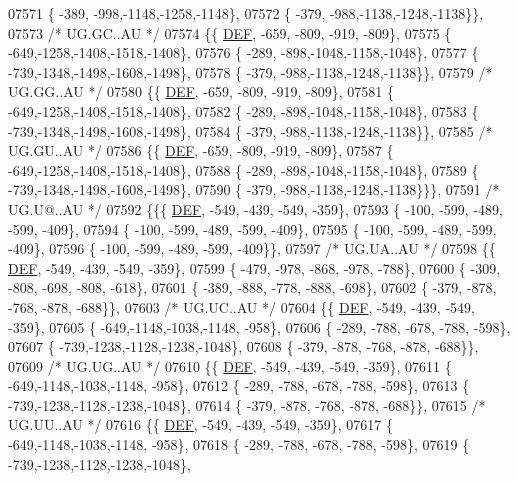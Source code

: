 \begin{DoxyCode}
07571 \{ -389, -998,-1148,-1258,-1148\},
07572 \{ -379, -988,-1138,-1248,-1138\}\},
07573 \textcolor{comment}{/* UG.GC..AU */}
07574 \{\{  \mbox{\hyperlink{1_88_84__epars_8h_a397419fc12b37ed479c8abb9d444d843}{DEF}}, -659, -809, -919, -809\},
07575 \{ -649,-1258,-1408,-1518,-1408\},
07576 \{ -289, -898,-1048,-1158,-1048\},
07577 \{ -739,-1348,-1498,-1608,-1498\},
07578 \{ -379, -988,-1138,-1248,-1138\}\},
07579 \textcolor{comment}{/* UG.GG..AU */}
07580 \{\{  \mbox{\hyperlink{1_88_84__epars_8h_a397419fc12b37ed479c8abb9d444d843}{DEF}}, -659, -809, -919, -809\},
07581 \{ -649,-1258,-1408,-1518,-1408\},
07582 \{ -289, -898,-1048,-1158,-1048\},
07583 \{ -739,-1348,-1498,-1608,-1498\},
07584 \{ -379, -988,-1138,-1248,-1138\}\},
07585 \textcolor{comment}{/* UG.GU..AU */}
07586 \{\{  \mbox{\hyperlink{1_88_84__epars_8h_a397419fc12b37ed479c8abb9d444d843}{DEF}}, -659, -809, -919, -809\},
07587 \{ -649,-1258,-1408,-1518,-1408\},
07588 \{ -289, -898,-1048,-1158,-1048\},
07589 \{ -739,-1348,-1498,-1608,-1498\},
07590 \{ -379, -988,-1138,-1248,-1138\}\}\},
07591 \textcolor{comment}{/* UG.U@..AU */}
07592 \{\{\{  \mbox{\hyperlink{1_88_84__epars_8h_a397419fc12b37ed479c8abb9d444d843}{DEF}}, -549, -439, -549, -359\},
07593 \{ -100, -599, -489, -599, -409\},
07594 \{ -100, -599, -489, -599, -409\},
07595 \{ -100, -599, -489, -599, -409\},
07596 \{ -100, -599, -489, -599, -409\}\},
07597 \textcolor{comment}{/* UG.UA..AU */}
07598 \{\{  \mbox{\hyperlink{1_88_84__epars_8h_a397419fc12b37ed479c8abb9d444d843}{DEF}}, -549, -439, -549, -359\},
07599 \{ -479, -978, -868, -978, -788\},
07600 \{ -309, -808, -698, -808, -618\},
07601 \{ -389, -888, -778, -888, -698\},
07602 \{ -379, -878, -768, -878, -688\}\},
07603 \textcolor{comment}{/* UG.UC..AU */}
07604 \{\{  \mbox{\hyperlink{1_88_84__epars_8h_a397419fc12b37ed479c8abb9d444d843}{DEF}}, -549, -439, -549, -359\},
07605 \{ -649,-1148,-1038,-1148, -958\},
07606 \{ -289, -788, -678, -788, -598\},
07607 \{ -739,-1238,-1128,-1238,-1048\},
07608 \{ -379, -878, -768, -878, -688\}\},
07609 \textcolor{comment}{/* UG.UG..AU */}
07610 \{\{  \mbox{\hyperlink{1_88_84__epars_8h_a397419fc12b37ed479c8abb9d444d843}{DEF}}, -549, -439, -549, -359\},
07611 \{ -649,-1148,-1038,-1148, -958\},
07612 \{ -289, -788, -678, -788, -598\},
07613 \{ -739,-1238,-1128,-1238,-1048\},
07614 \{ -379, -878, -768, -878, -688\}\},
07615 \textcolor{comment}{/* UG.UU..AU */}
07616 \{\{  \mbox{\hyperlink{1_88_84__epars_8h_a397419fc12b37ed479c8abb9d444d843}{DEF}}, -549, -439, -549, -359\},
07617 \{ -649,-1148,-1038,-1148, -958\},
07618 \{ -289, -788, -678, -788, -598\},
07619 \{ -739,-1238,-1128,-1238,-1048\},

\end{DoxyCode}
